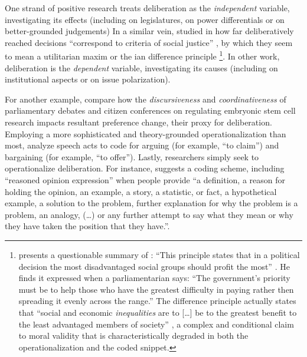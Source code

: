One strand of positive research treats deliberation as the \emph{independent} variable, investigating its effects (including \citealt{Bachtiger2005} on legislatures, \citealt{Hibbings2002} on power differentials or \citealt{Jackman2008} on better-grounded judgements) %
In a similar vein, \cite{Steiner2004} studied in how far deliberatively reached decisions ``correspond to criteria of social justice'' \cite[13]{Steiner2012}, by which they seem to mean a utilitarian maxim \citep{Bentham1789} or the \citeauthor{Rawls-1971-aa}ian difference principle \cite[95]{Steiner2012}
\footnote{
	\citeauthor{Steiner2012} presents a questionable summary of \citeauthor{Rawls-1971-aa}: 
	``This principle states that in a political decision the most disadvantaged social groups should profit the most'' \citep[95]{Steiner2012}.
	He finds it expressed when a parliamentarian says: 
	``The government's priority must be to help those who have the greatest difficulty in paying rather then spreading it evenly across the range.''
	The difference principle actually states that ``social and economic \emph{inequalities} are to [\ldots] be to the greatest benefit to the least advantaged members of society'' \cite[266]{Rawls-1971-aa}, a complex and conditional claim to moral validity that is characteristically degraded in both the operationalization and the coded snippet.
}.
In other work, deliberation is the \emph{dependent} variable, investigating its causes (including \citealt{Steiner2004} on institutional aspects or \citealt[13]{Steiner2012} on issue polarization).

For another example, \cite{Landwehr2010} compare how the \emph{discursiveness} and \emph{coordinativeness} of parliamentary debates and citizen conferences on regulating embryonic stem cell research impacts resultant preference change, their proxy for deliberation.
Employing a more sophisticated and theory-grounded operationalization than most, \cite[377]{Landwehr2010} analyze speech acts to code for arguing (for example, ``to claim'') and bargaining (for example, ``to offer''). %
Lastly, researchers simply seek to operationalize deliberation. 
For instance, \cite{Stromer-Galley2007} suggests a coding scheme, including ``reasoned opinion expression'' when people provide ``a definition, a reason for holding the opinion, an example, a story, a statistic, or fact, a hypothetical example, a solution to the problem, further explanation for why the problem is a problem, an analogy, (\ldots) or any further attempt to say what they mean or why they have taken the position that they have.''.

